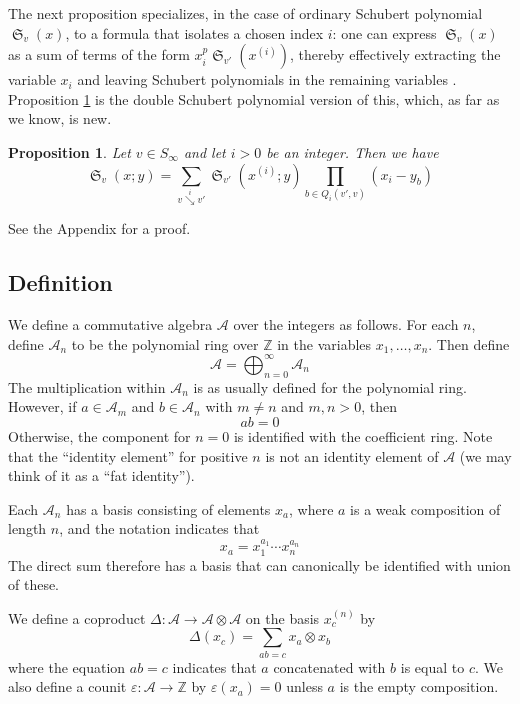 \documentclass{amsart}
\newtheorem{proposition}[lemma]{Proposition}
\theoremstyle{definition}
\theoremstyle{remark}
\numberwithin{equation}{subsection}
\DeclareMathOperator{\sch}{\mathfrak{S}}
\newcommand{\downvar}[1]{\stackrel{#1}{\searrow}}
\newcommand{\coma}{\mathcal{A}}
\begin{document}
	

The next proposition specializes, in the case of ordinary Schubert polynomial $\sch_v(x)$, to a formula that isolates a chosen index $i$: one can express $\sch_v(x)$ as a sum of terms of the form $x_i^p\sch_{v'}(x^{(i)})$, thereby effectively extracting the variable $x_i$ and leaving Schubert polynomials in the remaining variables \cite[Theorem~5.1]{bsskew}. Proposition \ref{proposition:pullindex} is the double Schubert polynomial version of this, which, as far as we know, is new.%

\begin{proposition} \label{proposition:pullindex}
Let $v\in S_\infty$ and let $i>0$ be an integer. Then we have
$$\sch_v(x;y)=\sum_{v\downvar{i} v'}\sch_{v'}(x^{(i)};y)\prod_{b\in Q_i(v',v)}(x_i - y_b)$$
\end{proposition}
See the Appendix for a proof.

\subsection{Definition}


We define a commutative algebra $\coma$ over the integers as follows. For each $n$, define $\coma_n$ to be the polynomial ring over $\mathbb{Z}$ in the variables $x_1,\ldots,x_n$. Then define
$$\coma =\bigoplus_{n=0}^\infty \coma_n$$
The multiplication within $\coma_n$ is as usually defined for the polynomial ring. However, if $a\in \coma_m$ and $b\in \coma_n$ with $m\neq n$ and $m,n>0$,  then
$$ab = 0$$
Otherwise, the component for $n=0$ is identified with the coefficient ring. Note that the ``identity element'' for positive $n$ is not an identity element of $\coma$ (we may think of it as a ``fat identity'').

Each $\coma_n$ has a basis consisting of elements $x_a$, where $a$ is a weak composition of length $n$, and the notation indicates that
$$x_a = x_1^{a_1}\cdots x_n^{a_n}$$
The direct sum therefore has a basis that can canonically be identified with union of these.

We define a coproduct $\Delta:\coma\to\coma\otimes\coma$ on the basis $x_c^{(n)}$ by
$$\Delta(x_c) = \sum_{ab=c} x_a\otimes x_b$$
where the equation $ab=c$ indicates that $a$ concatenated with $b$ is equal to $c$. We also define a counit $\varepsilon:\coma\to \mathbb{Z}$ by $\varepsilon(x_a)=0$ unless $a$ is the empty composition.
\end{document}
